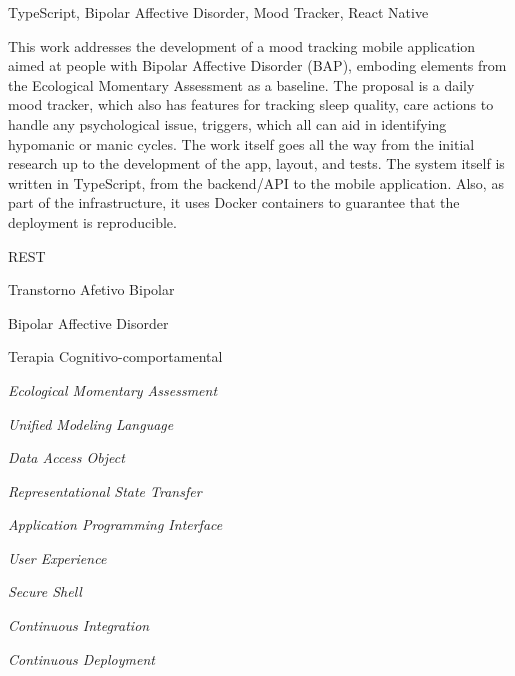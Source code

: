 \documentclass[tcc,capa,table]{textsi}
\begin{document}
\begin{englishabstract}%
  {TypeScript, Bipolar Affective Disorder, Mood Tracker, React Native}

  \noindent
  This work addresses the development of a mood tracking mobile application
  aimed at people with Bipolar Affective Disorder (BAP), emboding elements from
  the Ecological Momentary Assessment as a baseline. The proposal is a daily
  mood tracker, which also has features for tracking sleep quality, care
  actions to handle any psychological issue, triggers, which all can aid in
  identifying hypomanic or manic cycles. The work itself goes all the way from
  the initial research up to the development of the app, layout, and tests. The
  system itself is written in TypeScript, from the backend/API to the mobile
  application. Also, as part of the infrastructure, it uses Docker containers
  to guarantee that the deployment is reproducible.
\end{englishabstract}

\listoffigures

\listoftables

\lstlistoflistings

\begin{listofabbrv}{REST} %
	\item[TAB] Transtorno Afetivo Bipolar
  \item[BAP] Bipolar Affective Disorder
  \item[TCC] Terapia Cognitivo-comportamental
  \item[EMA] \textit{Ecological Momentary Assessment}
  \item[UML] \textit{Unified Modeling Language}
  \item[DAO] \textit{Data Access Object}
  \item[REST] \textit{Representational State Transfer}
  \item[API] \textit{Application Programming Interface}
  \item[UX] \textit{User Experience}
  \item[SSH] \textit{Secure Shell}
  \item[CI] \textit{Continuous Integration}
  \item[CD] \textit{Continuous Deployment}
\end{listofabbrv}
\end{document}
